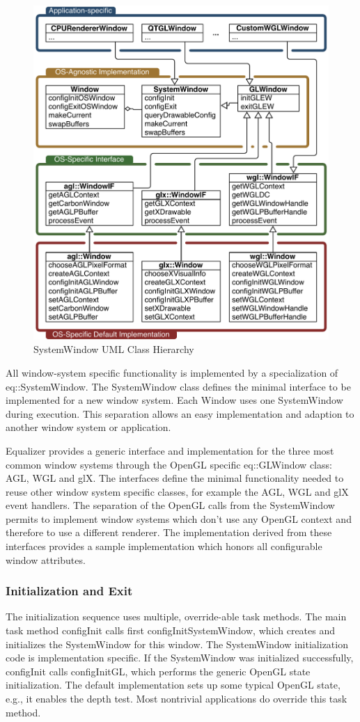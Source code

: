 \documentclass[10pt,a4]{scrartcl}
\begin{document}
\begin{figure}
  \includegraphics[width=.618\textwidth]{images/osWindow.pdf}
  {\caption{\label{fOSWindow}SystemWindow UML Class Hierarchy}}
\end{figure}
All window-system specific functionality is implemented by a specialization of
\textsf{eq::Sys\-tem\-Window}. The \textsf{SystemWindow} class defines the
minimal interface to be implemented for a new window system. Each
\textsf{Window} uses one \textsf{SystemWindow} during execution. This separation
allows an easy implementation and adaption to another window system or
application.

Equalizer provides a generic interface and implementation for the three
most common window systems through the OpenGL specific 
\textsf{eq::GL\-Window} class: AGL, WGL and glX. The interfaces define the
minimal functionality needed to reuse other window system specific
classes, for example the AGL, WGL and glX event handlers. The separation 
of the OpenGL calls from the \textsf{SystemWindow} permits to implement 
window systems which don't use any OpenGL context and therefore to use a 
different renderer. The implementation derived from these interfaces 
provides a sample implementation which honors all configurable window 
attributes.

\subsubsection{Initialization and Exit}

The initialization sequence uses multiple, override-able task
methods. The main task method \textsf{configInit} calls first
\textsf{configInitSystemWindow}, which creates and initializes the
\textsf{SystemWindow} for this window. The \textsf{SystemWindow} initialization
code is implementation specific. If the \textsf{SystemWindow} was
initialized successfully, \textsf{configInit} calls
\textsf{configInitGL}, which performs the generic OpenGL state
initialization. The default implementation sets up some typical OpenGL
state, e.g., it enables the depth test. Most nontrivial applications
do override this task method.
\end{document}
